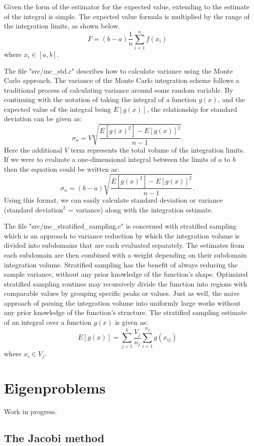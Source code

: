 \documentclass{book}
\begin{document}
Given the form of the estimator for the expected value, extending to the estimate of the integral is simple.
The expected value formula is multiplied by the range of the integration limits, as shown below.
$$
 F = (b-a) \frac{1}{n} \sum_{i=1}^n f(x_i)
$$
where $x_i \in [a, b]$.

The file "src/mc\_std.c" describes how to calculate variance using the Monte Carlo approach. The variance of
the Monte Carlo integration scheme follows a traditional process of calculating variance around some random variable.
By continuing with the notation of taking the integral of a function $g(x)$, and the expected value of the integral being $E[g(x)]$,
the relationship for standard deviation can be given as:
$$
 \sigma_n = V \sqrt{\frac{E[g(x)^2] - E[g(x)]^2}{n-1}}.
$$
Here the additional $V$ term represents the total volume of the integration limits. If we were to evaluate a one-dimensional
integral between the limits of $a$ to $b$ then the equation could be written as:
$$
 \sigma_n = (b-a) \sqrt{\frac{E[g(x)^2] - E[g(x)]^2}{n-1}}.
$$
Using this format, we can easily calculate standard deviation or variance (standard deviation$^2$ = variance) along with the integration estimate.

The file "src/mc\_stratified\_sampling.c" is concerned with stratified sampling which is an approach to variance reduction
by which the integration volume is divided into subdomains that are each evaluated separately. The estimates from each
subdomain are then combined with a weight depending on their subdomain integration volume. Stratified sampling has the
benefit of always reducing the sample variance, without any prior knowledge of the function’s shape. Optimized stratified
sampling routines may recursively divide the function into regions with comparable values by grouping specific peaks or values.
Just as well, the naive approach of parsing the integration volume into uniformly large works without any prior knowledge of the function’s structure.
The stratified sampling estimate of an integral over a function $g(x)$ is given as:
$$
 E[g(x)] = \sum_{j=1}^k \frac{V_j}{n_j} \sum_{i=1}^{n_j} g(x_{ij})
$$
where $x_i \in V_j$.



\section{Eigenproblems}

Work in progress.
\subsection{The Jacobi method}
\end{document}
